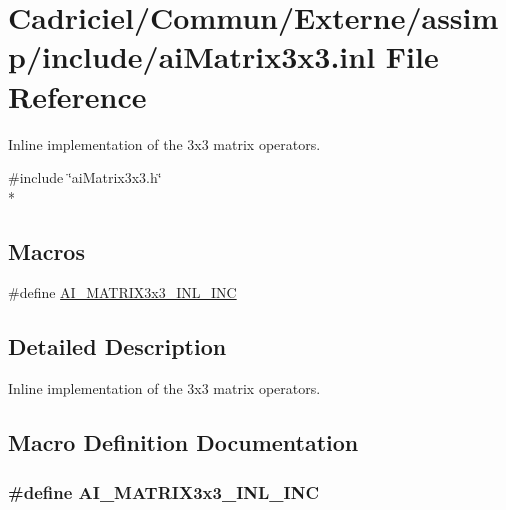 \hypertarget{ai_matrix3x3_8inl}{\section{Cadriciel/\-Commun/\-Externe/assimp/include/ai\-Matrix3x3.inl File Reference}
\label{ai_matrix3x3_8inl}
}


Inline implementation of the 3x3 matrix operators.  


{\ttfamily \#include \char`\"{}ai\-Matrix3x3.\-h\char`\"{}}\\*
\subsection*{Macros}
\begin{DoxyCompactItemize}
\item 
\#define \hyperlink{ai_matrix3x3_8inl_a2b803fc081e63b7b5acaef4a18035eee}{A\-I\-\_\-\-M\-A\-T\-R\-I\-X3x3\-\_\-\-I\-N\-L\-\_\-\-I\-N\-C}
\end{DoxyCompactItemize}


\subsection{Detailed Description}
Inline implementation of the 3x3 matrix operators. 

\subsection{Macro Definition Documentation}
\hypertarget{ai_matrix3x3_8inl_a2b803fc081e63b7b5acaef4a18035eee}{
\subsubsection[{A\-I\-\_\-\-M\-A\-T\-R\-I\-X3x3\-\_\-\-I\-N\-L\-\_\-\-I\-N\-C}]{\setlength{\rightskip}{0pt plus 5cm}\#define A\-I\-\_\-\-M\-A\-T\-R\-I\-X3x3\-\_\-\-I\-N\-L\-\_\-\-I\-N\-C}}\label{ai_matrix3x3_8inl_a2b803fc081e63b7b5acaef4a18035eee}
